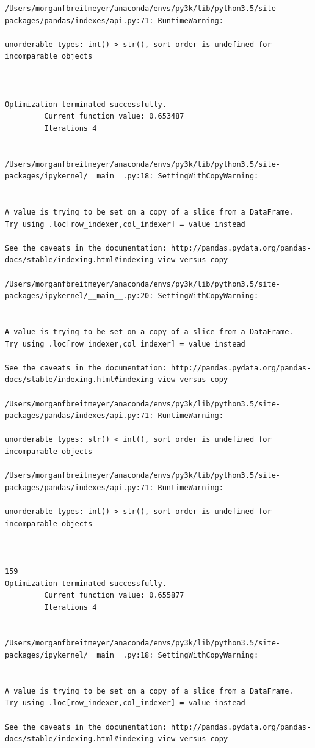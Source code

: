 \begin{lstlisting}
/Users/morganfbreitmeyer/anaconda/envs/py3k/lib/python3.5/site-packages/pandas/indexes/api.py:71: RuntimeWarning:

unorderable types: int() > str(), sort order is undefined for incomparable objects



Optimization terminated successfully.
         Current function value: 0.653487
         Iterations 4


/Users/morganfbreitmeyer/anaconda/envs/py3k/lib/python3.5/site-packages/ipykernel/__main__.py:18: SettingWithCopyWarning:


A value is trying to be set on a copy of a slice from a DataFrame.
Try using .loc[row_indexer,col_indexer] = value instead

See the caveats in the documentation: http://pandas.pydata.org/pandas-docs/stable/indexing.html#indexing-view-versus-copy

/Users/morganfbreitmeyer/anaconda/envs/py3k/lib/python3.5/site-packages/ipykernel/__main__.py:20: SettingWithCopyWarning:


A value is trying to be set on a copy of a slice from a DataFrame.
Try using .loc[row_indexer,col_indexer] = value instead

See the caveats in the documentation: http://pandas.pydata.org/pandas-docs/stable/indexing.html#indexing-view-versus-copy

/Users/morganfbreitmeyer/anaconda/envs/py3k/lib/python3.5/site-packages/pandas/indexes/api.py:71: RuntimeWarning:

unorderable types: str() < int(), sort order is undefined for incomparable objects

/Users/morganfbreitmeyer/anaconda/envs/py3k/lib/python3.5/site-packages/pandas/indexes/api.py:71: RuntimeWarning:

unorderable types: int() > str(), sort order is undefined for incomparable objects



159
Optimization terminated successfully.
         Current function value: 0.655877
         Iterations 4


/Users/morganfbreitmeyer/anaconda/envs/py3k/lib/python3.5/site-packages/ipykernel/__main__.py:18: SettingWithCopyWarning:


A value is trying to be set on a copy of a slice from a DataFrame.
Try using .loc[row_indexer,col_indexer] = value instead

See the caveats in the documentation: http://pandas.pydata.org/pandas-docs/stable/indexing.html#indexing-view-versus-copy


\end{lstlisting}
